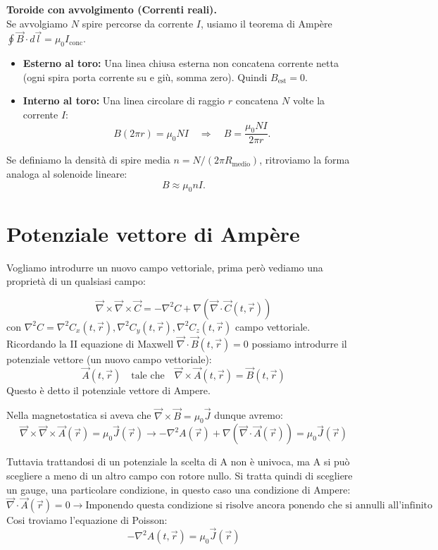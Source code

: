 \documentclass{book}
\begin{document}
\begin{itemize}
  \textbf{Toroide con avvolgimento (Correnti reali).} \\
  Se avvolgiamo \(N\) spire percorse da corrente \(I\), usiamo il teorema di Ampère \(\oint \vec{B} \cdot d\vec{l} = \mu_0 I_{\text{conc}}\).
  \begin{itemize}
      \item \textbf{Esterno al toro:} Una linea chiusa esterna non concatena corrente netta (ogni spira porta corrente su e giù, somma zero). Quindi \(B_{\text{est}} = 0\).
      \item \textbf{Interno al toro:} Una linea circolare di raggio \(r\) concatena \(N\) volte la corrente \(I\):
      \[
      B(2\pi r) = \mu_0 N I \quad \Longrightarrow \quad B = \frac{\mu_0 N I}{2\pi r}.
      \]
  \end{itemize}
  Se definiamo la densità di spire media \(n = N / (2\pi R_{\text{medio}})\), ritroviamo la forma analoga al solenoide lineare:
  \[
  B \approx \mu_0 n I.
  \]


\end{itemize}



\chapter{Potenziale vettore di Amp\`ere }

Vogliamo introdurre un nuovo campo vettoriale, prima però vediamo una proprietà di un qualsiasi campo:

$$
\vec{\nabla}\times \vec{\nabla} \times\vec{C}=- \nabla^2 C+\nabla(\vec{\nabla}\cdot\vec{C}(t,\vec{r}))
$$
con $\nabla^2 C = \nabla^2 C_x(t,\vec{r}), \nabla^2 C_y(t,\vec{r}), \nabla^2 C_z(t,\vec{r})$
campo vettoriale.
Ricordando la II equazione di Maxwell $\vec{\nabla}\cdot\vec{B}(t,\vec{r})=0$
possiamo introdurre il potenziale vettore (un nuovo campo vettoriale):
$$
\vec{A}(t,\vec{r})
\quad
\text{tale che}
\quad
\vec{\nabla}\times\vec{A}(t,\vec{r}) = \vec{B}(t,\vec{r})
$$
Questo è detto il potenziale vettore di Ampere.

Nella magnetostatica si aveva che $\vec{\nabla}\times\vec{B}=\mu_0\vec{J}$ dunque avremo:
$$
\vec{\nabla}\times\vec{\nabla}\times\vec{A}(\vec{r})
=\mu_0 \vec{J}(\vec{r})  \to -\nabla ^2 A(\vec{r})+\nabla(\vec{\nabla}\cdot\vec{A}(\vec{r})) = \mu_0\vec{J}(\vec{r}) $$

Tuttavia trattandosi di un potenziale la scelta di A non è univoca, ma A si può scegliere a meno di un altro campo con rotore nullo.
Si tratta quindi di scegliere un gauge, una particolare condizione, in questo caso una condizione di Ampere:
$$
\vec{\nabla} \cdot \vec{A}(\vec{r})=0 \to \text{Imponendo questa condizione si risolve ancora ponendo che si annulli all'infinito}
$$
Cosi troviamo l'equazione di Poisson:
$$
-\nabla^2 A(t,\vec{r})= \mu_0\vec{J}(\vec{r})
$$
\end{document}
